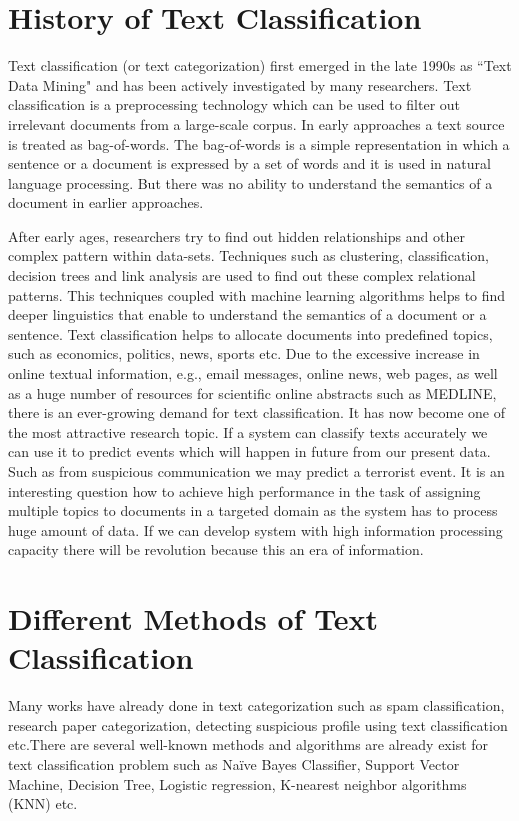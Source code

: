 \documentclass[12pt,a4paper]{report}
\begin{document}
\section{History of Text Classification}
Text classification (or text categorization)  first emerged in the late 1990s as ``Text Data Mining" and has been actively investigated by many researchers. Text classification is a preprocessing technology which can be used to filter out irrelevant documents from a large-scale corpus. In early approaches a text source is treated as bag-of-words. The bag-of-words is a simple representation in which a sentence or a document is expressed by a set of words and it is used in natural language processing. But there was no ability to understand the semantics of a document in earlier approaches.\par
\vspace{.5cm}
After early ages, researchers try to find out hidden relationships and other complex pattern within data-sets. Techniques such as clustering, classification, decision trees and link analysis are used to find out these complex relational patterns. This techniques coupled with machine learning algorithms helps to find deeper linguistics that enable to understand the semantics of a document or a sentence. Text classification helps to allocate documents into predefined topics, such as economics, politics, news, sports etc. Due to the excessive increase in online textual information, e.g., email messages, online news, web pages, as well as a huge number of resources for scientific online abstracts such as MEDLINE, there is an ever-growing demand for text classification. It has now become one of the most attractive research topic. If a system can classify texts accurately we can use it to predict events which will happen in future from our present data. Such as from suspicious communication we may predict a terrorist event. It is an interesting question how to achieve high performance in the task of assigning multiple topics to documents in a targeted domain as the system has to process huge amount of data. If we can develop system with high information processing capacity there will be revolution because this an era of information.


\section{Different Methods of Text Classification}
Many works have already done in text categorization such as spam classification, research paper categorization, detecting suspicious profile using text classification etc.There are several well-known methods and algorithms are already exist for text classification problem such as Naïve Bayes Classifier, Support Vector Machine, Decision Tree, Logistic regression, K-nearest neighbor algorithms (KNN) etc.
\end{document}
